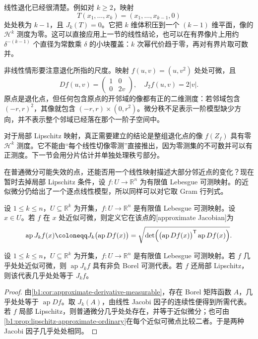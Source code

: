 线性退化已经很清楚。例如对 \(k\geq2\)，映射
\[
T(x_1,\ldots,x_k)=(x_1,\ldots,x_{k-1},0)
\]
处处秩为 \(k-1\)，且 \(J_k(T)=0\)。它把 \(k\) 维体积压到一个 \((k-1)\) 维平面，像的 \(\mathcal H^k\) 测度为零。这可以直接应用上一节的线性结论，也可以在有界像片上用约 \(\delta^{-(k-1)}\) 个直径为常数乘 \(\delta\) 的小块覆盖：\(k\) 次幂代价趋于零，再对有界片取可数并。

\ProseParagraphBreak

非线性情形要注意退化所指的尺度。映射 \(f(u,v)=(u,v^2)\) 处处可微，且
\[
Df(u,v)=
\begin{pmatrix}1&0\\0&2v\end{pmatrix},
\quad
J_2f(u,v)=2|v|.
\]
原点是退化点，但任何包含原点的开邻域的像都有正的二维测度：若邻域包含 \((-r,r)^2\)，其像就包含 \((-r,r)\times(0,r^2)\)。微分秩不足表示一阶模型缺少方向，并不表示整个邻域已经落在那个一阶子空间中。

\ProseParagraphBreak

对于局部 Lipschitz 映射，真正需要建立的结论是整组退化点的像 \(f(Z_f)\) 具有零 \(\mathcal H^k\) 测度。它不能由“每个线性切像零测”直接推出，因为零测集的不可数并可以有正测度。下一节会用分片估计并单独处理秩亏部分。


在普通微分可能失效的点，还能否用一个线性映射描述大部分邻近点的变化？现在暂时去掉局部 Lipschitz 条件，设 \(f:U\to\mathbb R^n\) 为有限值 Lebesgue 可测映射。的近似微分仍给出了一个逐点线性模型，所以同样可以对它取 Gram 行列式。

\begin{definition}
\label{b1:def:approximate-jacobian}
设 \(1\le k\le n\)，\(U\subseteq\mathbb R^k\) 为开集，\(f:U\to\mathbb R^n\) 是有限值 Lebesgue 可测映射。设 \(x\in U\)。若 \(f\) 在 \(x\) 处近似可微，则定义它在该点的[approximate Jacobian]为
\[
\operatorname{ap}J_k f(x)
\coloneqq J_k\bigl(\operatorname{ap}Df(x)\bigr)
=\sqrt{\det\Bigl(\bigl(\operatorname{ap}Df(x)\bigr)^{\mathsf T}
\operatorname{ap}Df(x)\Bigr)}.
\]
\end{definition}

\begin{proposition}
\label{b1:prop:approximate-jacobian-measurable}
设 \(1\le k\le n\)，\(U\subseteq\mathbb R^k\) 为开集，\(f:U\to\mathbb R^n\) 是有限值 Lebesgue 可测映射。若 \(f\) 几乎处处近似可微，则 \(\operatorname{ap}J_k f\) 具有非负 Borel 可测代表。若 \(f\) 还局部 Lipschitz，则该代表几乎处处等于 \(J_k f\)。
\end{proposition}
\begin{proof}
由\cref{b1:cor:approximate-derivative-measurable}，存在 Borel 矩阵函数 \(A\)，几乎处处等于 \(\operatorname{ap}Df\)。取 \(J_k(A)\)，由线性 Jacobi 因子的连续性便得到所需代表。若 \(f\) 局部 Lipschitz，则普通微分几乎处处存在，并等于近似微分；也可由\cref{b1:prop:lipschitz-approximate-ordinary}在每个近似可微点比较二者。于是两种 Jacobi 因子几乎处处相同。
\end{proof}

